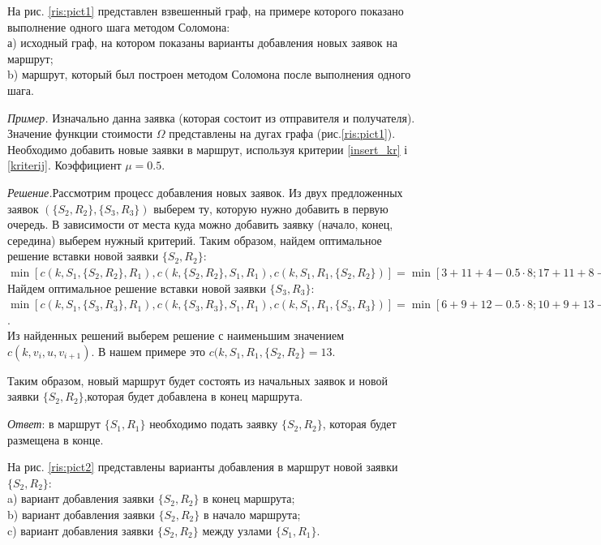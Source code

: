 \documentclass[]{TAACpaper}
\begin{document}
На рис. \ref{ris:pict1} представлен взвешенный граф, на примере которого показано выполнение одного шага методом Соломона: \\
а) исходный граф, на котором показаны варианты добавления новых заявок на маршрут; \\
b) маршрут, который был построен методом Соломона после выполнения одного шага.

\textit{Пример.} Изначально данна заявка (которая состоит из отправителя и получателя). Значение функции стоимости $\Omega$ представлены на дугах графа (рис.\ref{ris:pict1}). Необходимо добавить новые заявки в маршрут, используя критерии \ref{insert_kr} і \ref{kriterij}. Коэффициент $\mu=0.5$.

\textit{Решение.}Рассмотрим процесс добавления новых заявок. Из двух предложенных заявок $(\{S_2,R_2\},\{S_3,R_3\})$ выберем ту, которую нужно добавить в первую очередь. В зависимости от места куда можно добавить заявку (начало, конец, середина) выберем нужный критерий. Таким образом, найдем оптимальное решение вставки новой заявки $\{S_2,R_2\}$:\\
$\min[c(k,S_1, \{S_2, R_2\}, R_1), c(k,\{S_2, R_2\}, S_1, R_1), c(k, S_1, R_1, \{S_2, R_2\})]=\min[3+11+4-0.5 \cdot 8; 17+11+8-0.5 \cdot 20; 2+11]=\min[14;26;13]$\\
Найдем оптимальное решение вставки новой заявки $\{S_3,R_3\}$:\\ 
$\min[c(k,S_1, \{S_3, R_3\}, R_1), c(k,\{S_3, R_3\}, S_1, R_1), c(k, S_1, R_1, \{S_3, R_3\})]=\min[6+9+12-0.5 \cdot 8; 10+9+13-0.5 \cdot 20; 5+9]=\min[23;22;14]$.\\
Из найденных решений выберем решение с наименьшим значением $c(k,v_i,u,v_{i+1})$. В нашем примере это $c(k, S_1, R_1, \{S_2, R_2\}=13$.

Таким образом, новый маршрут будет состоять из начальных заявок и новой заявки $\{S_2,R_2\}$,которая будет добавлена в конец маршрута.

\textit{Ответ}: в маршрут $\{S_1,R_1\}$ необходимо подать заявку $\{S_2,R_2\}$, которая будет размещена в конце.

На рис. \ref{ris:pict2} представлены варианты добавления в маршрут новой заявки $\{S_2,R_2\}$:\\
a) вариант добавления заявки $\{S_2,R_2\}$ в конец маршрута;\\
b) вариант добавления заявки $\{S_2,R_2\}$ в начало маршрута;\\
c) вариант добавления заявки $\{S_2,R_2\}$ между узлами $\{S_1,R_1\}$.
\end{document}
